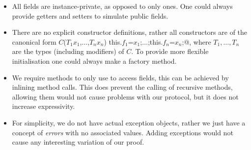 \begin{itemize}
\item All fields are instance-private, as opposed to only \Q@capsule@ ones. One could always provide getters and setters to simulate public fields.
\item There are no explicit constructor definitions, rather all constructors are of the canonical form
\Q@$C$($T_1 x_1$,$\ldots$,$T_n x_n$) {this.$f_1$=$x_1$;$\ldots$;this.$f_n$=$x_n$;}@,
 where $T_1, \ldots, T_n$ are the types (including modifiers) of $C$.
To provide more flexible initialisation one could always make a factory method.
\item We require \validate{} methods to only use \Q@this@ to access fields,
this can be achieved by inlining method calls. 
This does prevent the calling of recursive methods, allowing them would not cause problems with our protocol, but it does not increase expressivity.
\item For simplicity, we do not have actual exception objects,
rather we just have a concept of \emph{errors} with no associated values.
Adding \Q@imm@ exceptions would not cause any interesting variation of our proof.
\end{itemize}


